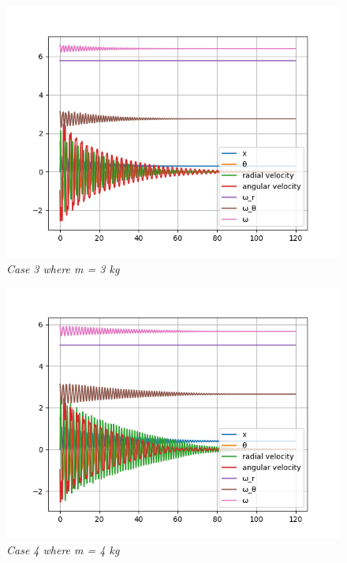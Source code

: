 \begin{figure}[H]
    \centering
    \includegraphics[width=15cm]{ExpPictures/m3.png}
    \caption{\textit{Case 3 where m = 3 kg}}
    \label{}
\end{figure}
        
\begin{figure}[H]
    \centering
    \includegraphics[width=15cm]{ExpPictures/m4.png}
    \caption{\textit{Case 4 where m = 4 kg}}
    \label{}
\end{figure}
        
